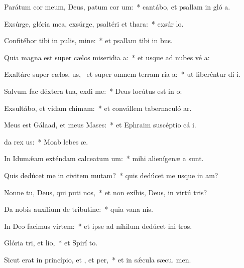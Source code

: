 \item Parátum cor meum, Deus, patum cor um:~* cantábo, et psallam in gló a.
\item Exsúrge, glória mea, exsúrge, psaltéri et thara:~* exsúr lo.
\item Confitébor tibi in pulis, mine:~* et psallam tibi in bus.
\item Quia magna est super cælos miseridia a:~* et usque ad nubes vé a:
\item Exaltáre super cælos, us,~\pscross{} et super omnem terram ria a:~* ut liberéntur di i.
\item Salvum fac déxtera tua,  exdi me:~* Deus locútus est in  o:
\item Exsultábo, et vidam chimam:~* et convállem tabernaculó ar.
\item Meus est Gálaad, et meus  Mases:~* et Ephraim suscéptio cá i.
\item {}da rex us:~* Moab lebes  æ.
\item In Idumǽam exténdam calceatum um:~* mihi alienígenæ a  sunt.
\item Quis dedúcet me in civitem mutam?~* quis dedúcet me usque in am?
\item Nonne tu, Deus, qui puti nos,~* et non exíbis, Deus, in virtú tris?
\item Da nobis auxílium de tributine:~* quia vana  nis.
\item In Deo facimus virtem:~* et ipse ad níhilum dedúcet ini tros.
\item Glória tri, et lio,~* et Spirí to.
\item Sicut erat in princípio, et , et per,~* et in sǽcula sæcu. men.
